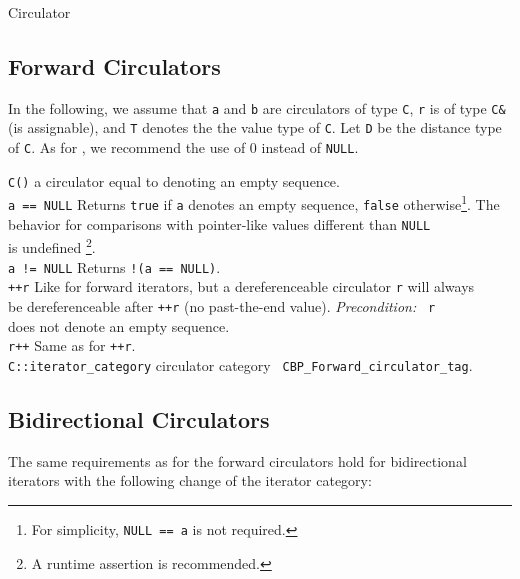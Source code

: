 \begin{ccRefConcept}{Circulator}
\subsection*{Forward Circulators}

In the following, we assume that {\tt a} and {\tt b} are circulators
of type {\tt C}, {\tt r} is of type {\tt C\&} (is assignable), and
{\tt T} denotes the the value type of {\tt C}.  Let {\tt D} be the
distance type of {\tt C}.  As for \CC, we recommend the use of 0
instead of {\tt NULL}.

\begin{tabbing}
    {\tt C()}         \> a circulator equal to  denoting an 
                         empty sequence.\\
    {\tt a == NULL}   \> Returns {\tt true} if {\tt a} denotes an empty
                         sequence, {\tt false} otherwise\footnote{For 
                           simplicity, {\tt NULL == a} is not required.}. The\\
                      \> behavior for comparisons with pointer-like 
                         values different than {\tt NULL} \\
                      \> is undefined%
                         \footnote{A runtime assertion is 
                         recommended.}.\\
    {\tt a != NULL}   \> Returns {\tt !(a == NULL)}. \\
    {\tt ++r}         \> Like for forward iterators, but a dereferenceable
                         circulator {\tt r} will always\\
                      \> be dereferenceable after {\tt ++r} (no
                         past-the-end value). {\em Precondition:} {\tt
                           r} \\
                      \> does not denote an empty sequence.\\
    {\tt r++}         \> Same as for {\tt ++r}.\\
    {\tt C::iterator\_category} \>  circulator category {\tt 
                                      CBP\_Forward\_circulator\_tag}.
\end{tabbing}

\subsection*{Bidirectional Circulators}

The same requirements as for the forward circulators hold for
bidirectional iterators with the following change of the iterator
category:


\end{ccRefConcept}
